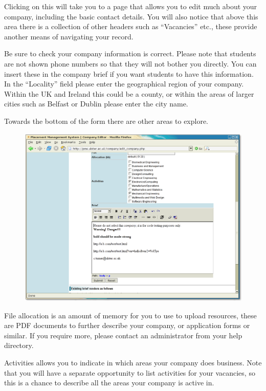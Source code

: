 \documentclass{article}
\begin{document}
Clicking on this will take you to a page that allows you to edit much about your company,
including the basic contact details. You will also notice that above this area there is
a collection of other headers such as ``Vacancies'' etc., these provide another means of
navigating your record.

Be sure to check your company information is correct. Please note that students are not
shown phone numbers so that they will not bother you directly. You can insert these in the
company brief if you want students to have this information. In the ``Locality'' field please
enter the geographical region of your company. Within the UK and Ireland this could be a
county, or within the areas of larger cities such as Belfast or Dublin please enter the
city name.

Towards the bottom of the form there are other areas to explore.

\begin{figure}[htb]
\begin{center}
\includegraphics[scale=0.25]{png/company_hr3.png}
\end{center}
\end{figure}


File allocation is an amount of memory for you to use to upload resources, these are PDF
documents to further describe your company, or application forms or similar. If you require more, please contact an administrator
from your help directory.

Activities allows you to indicate in which areas your company does business. Note that you will have a separate opportunity to list activities for your vacancies, so this is a chance to describe all the areas your company is active in.
\end{document}
